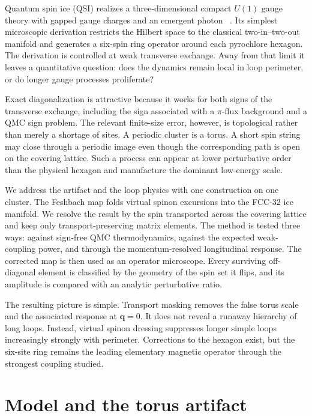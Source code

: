 \documentclass[aps,prb,twocolumn,amsmath,amssymb,superscriptaddress,
longbibliography,floatfix]{revtex4-2}
\newcommand{\bq}{\bm q}
\begin{document}
Quantum spin ice (QSI) realizes a three-dimensional compact $U(1)$ gauge
theory with gapped gauge charges and an emergent photon
~\cite{Hermele2004,Gingras2014,Benton2012}.  Its simplest microscopic
derivation restricts the Hilbert space to the classical two-in--two-out
manifold and generates a six-spin ring operator around each pyrochlore
hexagon.  The derivation is controlled at weak transverse exchange.  Away
from that limit it leaves a quantitative question: does the dynamics remain
local in loop perimeter, or do longer gauge processes proliferate?

Exact diagonalization is attractive because it works for both signs of the
transverse exchange, including the sign associated with a $\pi$-flux
background and a QMC sign problem.  The relevant finite-size error, however,
is topological rather than merely a shortage of sites.  A periodic cluster is
a torus.  A short spin string may close through a periodic image even though
the corresponding path is open on the covering lattice.  Such a process can
appear at lower perturbative order than the physical hexagon and manufacture
the dominant low-energy scale.

We address the artifact and the loop physics with one construction on one
cluster.  The Feshbach map folds virtual spinon excursions into the FCC-32 ice
manifold.  We resolve the result by the spin transported across the covering
lattice and keep only transport-preserving matrix elements.  The method is
tested three ways: against sign-free QMC thermodynamics, against the expected
weak-coupling power, and through the momentum-resolved longitudinal response.
The corrected map is then used as an operator microscope.  Every surviving
off-diagonal element is classified by the geometry of the spin set it flips,
and its amplitude is compared with an analytic perturbative ratio.

The resulting picture is simple.  Transport masking removes the false torus
scale and the associated response at $\bq=0$.  It does not reveal a runaway
hierarchy of long loops.  Instead, virtual spinon dressing suppresses longer
simple loops increasingly strongly with perimeter.  Corrections to the
hexagon exist, but the six-site ring remains the leading elementary magnetic
operator through the strongest coupling studied.

\section{Model and the torus artifact}
\label{sec:model}
\end{document}
